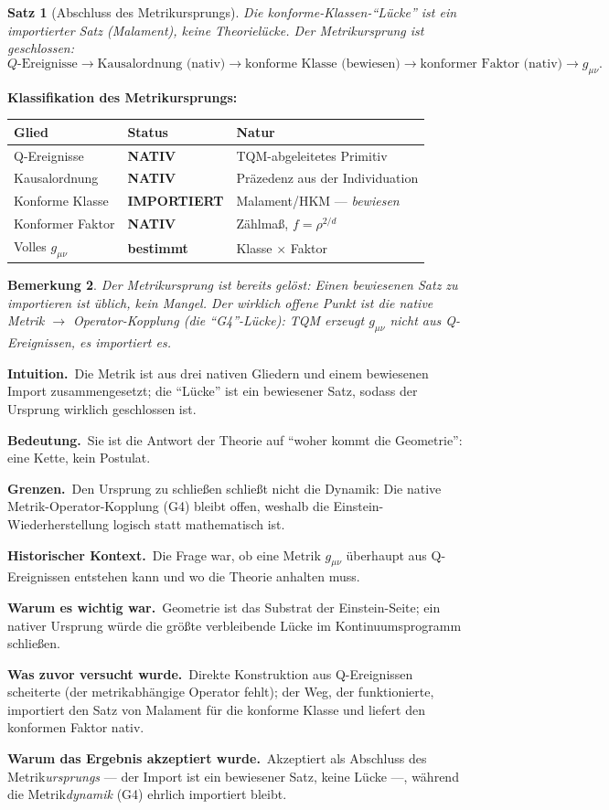\documentclass[10pt,twoside,openany]{book}
\newtheorem{theorem}{Satz}[chapter]
\newtheorem{remark}[theorem]{Bemerkung}
\newcommand{\theoremnotes}[3]{%
  \par\medskip\noindent
  \textbf{Intuition.}\ #1\par
  \textbf{Bedeutung.}\ #2\par
  \textbf{Grenzen.}\ #3\par}
\newcommand{\historynotes}[4]{%
  \par\smallskip\noindent
  \textbf{Historischer Kontext.}\ #1\par
  \textbf{Warum es wichtig war.}\ #2\par
  \textbf{Was zuvor versucht wurde.}\ #3\par
  \textbf{Warum das Ergebnis akzeptiert wurde.}\ #4\par}
\begin{document}
\begin{theorem}[Abschluss des Metrikursprungs]
Die konforme-Klassen-``Lücke'' ist ein \emph{importierter Satz} (Malament), keine
Theorielücke. Der Metrikursprung ist geschlossen:
\begin{equation}
Q\text{-Ereignisse} \to \text{Kausalordnung (nativ)}
\to \text{konforme Klasse (bewiesen)}
\to \text{konformer Faktor (nativ)}
\to g_{\mu\nu}.
\end{equation}
\end{theorem}

\textbf{Klassifikation des Metrikursprungs:}

\begin{center}
\begin{tabular}{lll}
\toprule
Glied & Status & Natur \\
\midrule
Q-Ereignisse & \textbf{NATIV} & TQM-abgeleitetes Primitiv \\
Kausalordnung & \textbf{NATIV} & Präzedenz aus der Individuation \\
Konforme Klasse & \textbf{IMPORTIERT} & Malament/HKM — \emph{bewiesen} \\
Konformer Faktor & \textbf{NATIV} & Zählmaß, $f=\rho^{2/d}$ \\
Volles $g_{\mu\nu}$ & \textbf{bestimmt} & Klasse $\times$ Faktor \\
\bottomrule
\end{tabular}
\end{center}

\begin{remark}
Der Metrikursprung ist \emph{bereits gelöst}: Einen bewiesenen Satz zu importieren ist
üblich, kein Mangel. Der wirklich offene Punkt ist die \emph{native} Metrik $\to$
Operator-Kopplung (die ``G4''-Lücke): TQM erzeugt $g_{\mu\nu}$ nicht aus Q-Ereignissen,
es importiert es.
\end{remark}

\theoremnotes
{Die Metrik ist aus drei nativen Gliedern und einem bewiesenen Import zusammengesetzt;
die ``Lücke'' ist ein bewiesener Satz, sodass der Ursprung wirklich geschlossen ist.}
{Sie ist die Antwort der Theorie auf ``woher kommt die Geometrie'': eine Kette, kein
Postulat.}
{Den Ursprung zu schließen schließt nicht die Dynamik: Die native
Metrik-Operator-Kopplung (G4) bleibt offen, weshalb die Einstein-Wiederherstellung
logisch statt mathematisch ist.}

\historynotes
{Die Frage war, ob eine Metrik $g_{\mu\nu}$ überhaupt aus Q-Ereignissen entstehen kann und
wo die Theorie anhalten muss.}
{Geometrie ist das Substrat der Einstein-Seite; ein nativer Ursprung würde die größte
verbleibende Lücke im Kontinuumsprogramm schließen.}
{Direkte Konstruktion aus Q-Ereignissen scheiterte (der metrikabhängige Operator fehlt);
der Weg, der funktionierte, importiert den Satz von Malament für die konforme Klasse und
liefert den konformen Faktor nativ.}
{Akzeptiert als Abschluss des Metrik\emph{ursprungs} --- der Import ist ein bewiesener
Satz, keine Lücke ---, während die Metrik\emph{dynamik} (G4) ehrlich importiert bleibt.}
\end{document}
